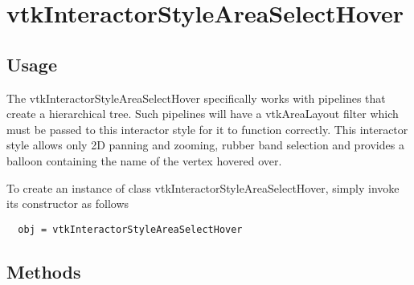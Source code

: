 \section{vtkInteractorStyleAreaSelectHover}

\subsection{Usage}

 The vtkInteractorStyleAreaSelectHover specifically works with pipelines
 that create a hierarchical tree.  Such pipelines will have a vtkAreaLayout
 filter which must be passed to this interactor style for it to function
 correctly.
 This interactor style allows only 2D panning and zooming,
 rubber band selection and provides a balloon containing the name of the
 vertex hovered over.

To create an instance of class vtkInteractorStyleAreaSelectHover, simply
invoke its constructor as follows
\begin{verbatim}
  obj = vtkInteractorStyleAreaSelectHover
\end{verbatim}
\subsection{Methods}

